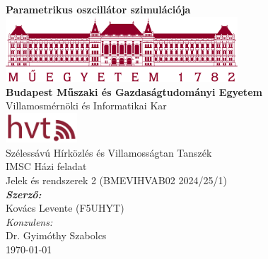 \documentclass[12pt,a4paper]{report}
\begin{document}
\begin{titlepage}
    \centering
    \vspace*{\fill}
    \textbf{\Huge Parametrikus oszcillátor szimulációja}\\[2cm]
    \includegraphics[width=0.65\textwidth]{figures/bme_logo_nagy_bordo.jpg}\\[1cm]
    \textbf{\Large Budapest Műszaki és Gazdaságtudományi Egyetem}\\[0.25cm]
    \Large Villamosmérnöki és Informatikai Kar\\[1cm]
    \includegraphics[width=0.2\textwidth]{figures/hvt-logo.png}\\[0.25cm]
    \Large Szélessávú Hírközlés és Villamosságtan Tanszék\\[2cm]
    \Large IMSC Házi feladat\\[0.25cm]
    \Large Jelek és rendszerek 2 (BMEVIHVAB02 2024/25/1)\\[1.5cm]
    \Large \textbf{\textit{Szerző:}}\\[0.25cm]
    \Large Kovács Levente (F5UHYT)\\[1cm]
    \small \textit{Konzulens:}\\[0.25cm]
    \small Dr. Gyimóthy Szabolcs\\[2cm]
    \Large \today
    \vspace*{\fill}
\end{titlepage}
\newpage

\tableofcontents
\newpage
\end{document}
